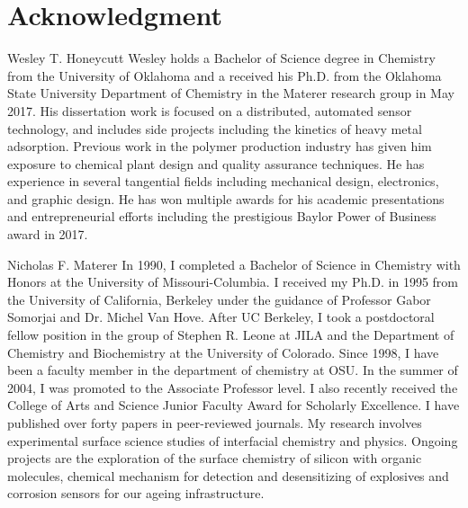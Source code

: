 \documentclass[journal]{IEEEtran}
\begin{document}
	\section*{Acknowledgment}
	
	
	
	
	
	
	
	
	\begin{IEEEbiography}{Wesley T. Honeycutt}
		Wesley holds a Bachelor of Science degree in Chemistry from the University of Oklahoma and a received his Ph.D. from the Oklahoma State University Department of Chemistry in the Materer research group in May 2017.  His dissertation work is focused on a distributed, automated sensor technology, and includes side projects including the kinetics of heavy metal adsorption.  Previous work in the polymer production industry has given him exposure to chemical plant design and quality assurance techniques.  He has experience in several tangential fields including mechanical design, electronics, and graphic design. He has won multiple awards for his academic presentations and entrepreneurial efforts including the prestigious Baylor Power of Business award in 2017.  
	\end{IEEEbiography}
	
	\begin{IEEEbiography}{Nicholas F. Materer}
		In 1990, I completed a Bachelor of Science in Chemistry with Honors at the University of Missouri-Columbia. I received my Ph.D. in 1995 from the University of California, Berkeley under the guidance of Professor Gabor Somorjai and Dr. Michel Van Hove. After UC Berkeley, I took a postdoctoral fellow position in the group of Stephen R. Leone at JILA and the Department of Chemistry and Biochemistry at the University of Colorado. Since 1998, I have been a faculty member in the department of chemistry at OSU. In the summer of 2004, I was promoted to the Associate Professor level. I also recently received the College of Arts and Science Junior Faculty Award for Scholarly Excellence. I have published over forty papers in peer-reviewed journals. My research involves experimental surface science studies of interfacial chemistry and physics. Ongoing projects are the exploration of the surface chemistry of silicon with organic molecules, chemical mechanism for detection and desensitizing of explosives and corrosion sensors for our ageing infrastructure.
	\end{IEEEbiography}
	
\end{document}
